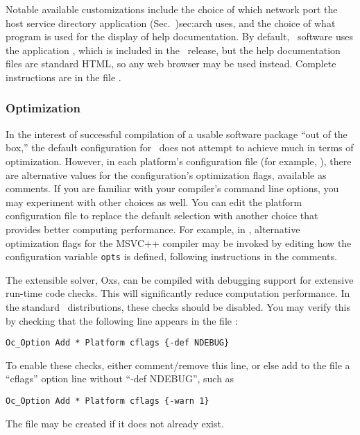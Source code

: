 Notable available customizations include the choice of which network
port the  {host service
directory application (Sec.~}{)}{sec:arch} uses, and the choice of what
program is used for the display of help documentation.  By default, 
\OOMMF\ software uses the application
, which
is included in the \OOMMF\ release, but the help documentation files
are standard HTML, so any web browser 
may be used instead.  Complete
instructions are in the file .

\subsubsection{Optimization}\label{sec:optimize}

In the interest of successful compilation of a usable software package
``out of the box,'' the default configuration for \OOMMF\ does not
attempt to achieve much in terms of optimization.  However, in each
platform's configuration file (for example,
), there are alternative values for the
configuration's optimization flags, available as comments.  If you are
familiar with your compiler's command line options, you may experiment
with other choices as well.  You can edit the platform configuration
file to replace the default selection with another choice that
provides better computing performance.  For example, in
, alternative optimization flags for the
MSVC++ compiler may be invoked by editing how the configuration
variable {\tt opts} is defined, following instructions in the comments.

The extensible solver, Oxs, can be compiled with debugging support
for extensive run-time code checks.  This will significantly reduce
computation performance.  In the standard \OOMMF\ distributions, these
checks should be disabled.  You may verify this by checking that
the following line appears in the file :
\begin{verbatim}
Oc_Option Add * Platform cflags {-def NDEBUG}
\end{verbatim}
To enable these checks, either comment/remove this line, or else add 
to the  file a ``cflags'' option line
without ``-def NDEBUG'', such as
\begin{verbatim}
Oc_Option Add * Platform cflags {-warn 1}
\end{verbatim}
The  file may be created if it does not
already exist.

